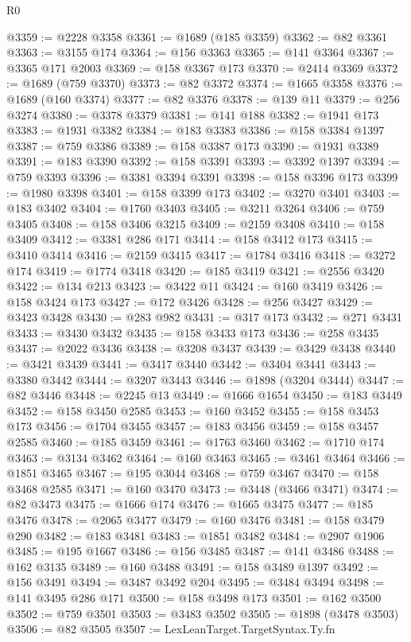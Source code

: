 \begin{lexlean}{R0}
\begin{coremodule}
@3359 := @2228 @3358
@3361 := @1689 (@185 @3359)
@3362 := @82 @3361
@3363 := @3155 @174
@3364 := @156 @3363
@3365 := @141 @3364
@3367 := @3365 @171 @2003
@3369 := @158 @3367 @173
@3370 := @2414 @3369
@3372 := @1689 (@759 @3370)
@3373 := @82 @3372
@3374 := @1665 @3358
@3376 := @1689 (@160 @3374)
@3377 := @82 @3376
@3378 := @139 @11
@3379 := @256 @3274
@3380 := @3378 @3379
@3381 := @141 @188
@3382 := @1941 @173
@3383 := @1931 @3382
@3384 := @183 @3383
@3386 := @158 @3384 @1397
@3387 := @759 @3386
@3389 := @158 @3387 @173
@3390 := @1931 @3389
@3391 := @183 @3390
@3392 := @158 @3391
@3393 := @3392 @1397
@3394 := @759 @3393
@3396 := @3381 @3394 @3391
@3398 := @158 @3396 @173
@3399 := @1980 @3398
@3401 := @158 @3399 @173
@3402 := @3270 @3401
@3403 := @183 @3402
@3404 := @1760 @3403
@3405 := @3211 @3264
@3406 := @759 @3405
@3408 := @158 @3406 @3215
@3409 := @2159 @3408
@3410 := @158 @3409
@3412 := @3381 @286 @171
@3414 := @158 @3412 @173
@3415 := @3410 @3414
@3416 := @2159 @3415
@3417 := @1784 @3416
@3418 := @3272 @174
@3419 := @1774 @3418
@3420 := @185 @3419
@3421 := @2556 @3420
@3422 := @134 @213
@3423 := @3422 @11
@3424 := @160 @3419
@3426 := @158 @3424 @173
@3427 := @172 @3426
@3428 := @256 @3427
@3429 := @3423 @3428
@3430 := @283 @982
@3431 := @317 @173
@3432 := @271 @3431
@3433 := @3430 @3432
@3435 := @158 @3433 @173
@3436 := @258 @3435
@3437 := @2022 @3436
@3438 := @3208 @3437
@3439 := @3429 @3438
@3440 := @3421 @3439
@3441 := @3417 @3440
@3442 := @3404 @3441
@3443 := @3380 @3442
@3444 := @3207 @3443
@3446 := @1898 (@3204 @3444)
@3447 := @82 @3446
@3448 := @2245 @13
@3449 := @1666 @1654
@3450 := @183 @3449
@3452 := @158 @3450 @2585
@3453 := @160 @3452
@3455 := @158 @3453 @173
@3456 := @1704 @3455
@3457 := @183 @3456
@3459 := @158 @3457 @2585
@3460 := @185 @3459
@3461 := @1763 @3460
@3462 := @1710 @174
@3463 := @3134 @3462
@3464 := @160 @3463
@3465 := @3461 @3464
@3466 := @1851 @3465
@3467 := @195 @3044
@3468 := @759 @3467
@3470 := @158 @3468 @2585
@3471 := @160 @3470
@3473 := @3448 (@3466 @3471)
@3474 := @82 @3473
@3475 := @1666 @174
@3476 := @1665 @3475
@3477 := @185 @3476
@3478 := @2065 @3477
@3479 := @160 @3476
@3481 := @158 @3479 @290
@3482 := @183 @3481
@3483 := @1851 @3482
@3484 := @2907 @1906
@3485 := @195 @1667
@3486 := @156 @3485
@3487 := @141 @3486
@3488 := @162 @3135
@3489 := @160 @3488
@3491 := @158 @3489 @1397
@3492 := @156 @3491
@3494 := @3487 @3492 @204
@3495 := @3484 @3494
@3498 := @141 @3495 @286 @171
@3500 := @158 @3498 @173
@3501 := @162 @3500
@3502 := @759 @3501
@3503 := @3483 @3502
@3505 := @1898 (@3478 @3503)
@3506 := @82 @3505
@3507 := LexLeanTarget.TargetSyntax.Ty.fn

\end{coremodule}
\end{lexlean}

